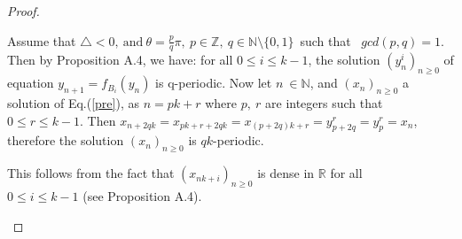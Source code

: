 \documentclass[11pt]{amsart}
\theoremstyle{definition}
\theoremstyle{remark}
\theoremstyle{example}
\numberwithin{equation}{section}
\begin{document}
\begin{proof}
\begin{description}[leftmargin=*]
\item[(3-1)] Assume that $\triangle<0, \ \text{and} \ \theta=\frac{p}{q}\pi, \ p \in \mathbb{Z},
\ q \in \mathbb{N}\setminus\{0,1\}$\ such that \ $gcd(p,q)=1$.
Then by Proposition A.4, we have: for all $0\leq i\leq k-1$, the solution $(y_n^i)_{n\geq0}$ of
equation $y_{n+1}=f_{B_i}(y_n)$ is q-periodic. Now let $n \ \in \mathbb{N}$, and $(x_n)_{n\geq0}$ a solution of
Eq.(\ref{pre}), as $n=pk+r$ where $p, \ r$ are integers such that $0\leq r\leq k-1$. Then
$x_{n+2qk}=x_{pk+r+2qk}=x_{(p+2q)k+r}=y_{p+2q}^r=y_p^r=x_n$, therefore the solution $(x_n)_{n\geq0}$ is $qk$-periodic.
\medskip

\item[(3-2)] This follows from the fact that $(x_{nk+i})_{n\geq0}$ is dense in $\mathbb{R}$ for all\\ $0\leq i\leq k-1$
(see Proposition A.4).
\end{description}
\end{proof}
\end{document}

